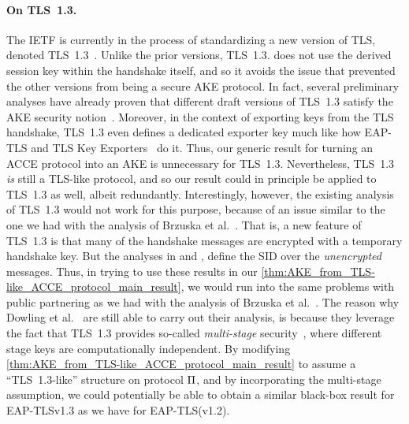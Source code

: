 \paragraph{On TLS~1.3.}
The IETF is currently in the process of standardizing a new version of TLS, denoted TLS~1.3~\cite{IETF:DRAFT:TLS_1.3}.
Unlike the prior versions,
TLS~1.3. does not use the derived session key within the handshake itself,
and so it avoids the issue that prevented the other versions from being a secure AKE protocol.
In fact,
several preliminary analyses have already proven that different draft versions of TLS~1.3 satisfy the AKE security notion~\cite{CCS:DFGS15,EPRINT:KraWee15,EPRINT:DFGS16}.
Moreover,
in the context of exporting keys from the TLS handshake,
TLS~1.3 even defines a dedicated exporter key much like how EAP-TLS and TLS Key Exporters~\cite{IETF:RFC5705:TLS-key-exporters} do it.
Thus,
our generic result for turning an ACCE protocol into an AKE is unnecessary for TLS~1.3.
Nevertheless,
TLS~1.3 \emph{is} still a TLS-like protocol,
and so our result could in principle be applied to TLS~1.3 as well,
albeit redundantly.
Interestingly,
however,
the existing analysis of TLS~1.3 would  not work for this purpose,
because of an issue similar to the one we had with the analysis of Brzuska et al.~\cite{BrzuskaFSWW:2012:less_is_more}.
That is,
a new feature of TLS~1.3 is that many of the handshake messages are encrypted with a temporary handshake key.
But the analyses in \cite{CCS:DFGS15} and \cite{EPRINT:DFGS16},
define the SID over the \emph{unencrypted} messages.
Thus,
in trying to use these results in our \cref{thm:AKE_from_TLS-like_ACCE_protocol_main_result},
we would run into the same problems with public partnering as we had with the analysis of Brzuska et al.~\cite{BrzuskaFSWW:2012:less_is_more}.
The reason why Dowling et al.~\cite{CCS:DFGS15, EPRINT:DFGS16} are still able to carry out their analysis,
is because they leverage the fact that TLS~1.3 provides so-called \emph{multi-stage} security~\cite{CCS:FisGue14},
where different stage keys are computationally independent.
By modifying \cref{thm:AKE_from_TLS-like_ACCE_protocol_main_result} to assume a ``TLS~1.3-like'' structure on protocol $\mathrm{\Pi}$,
and by incorporating the multi-stage assumption,
we could potentially be able to obtain a similar black-box result for EAP-TLSv1.3 as we have for EAP-TLS(v1.2).




